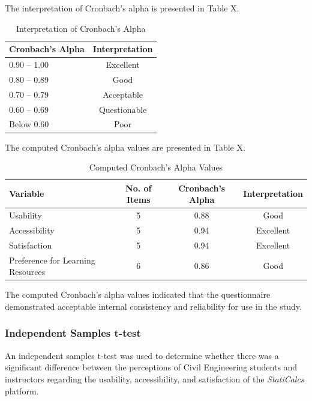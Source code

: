 The interpretation of Cronbach’s alpha is presented in Table X.

\begin{table}[H]
\centering
\caption{Interpretation of Cronbach's Alpha}
\small
\renewcommand{\arraystretch}{1.3}

\begin{tabular}{lc}
\hline
\textbf{Cronbach's Alpha} & \textbf{Interpretation}\\
\hline
0.90 -- 1.00 & Excellent\\
0.80 -- 0.89 & Good\\
0.70 -- 0.79 & Acceptable\\
0.60 -- 0.69 & Questionable\\
Below 0.60 & Poor\\
\hline
\end{tabular}
\end{table}

The computed Cronbach’s alpha values are presented in Table X.

\begin{table}[H]
\centering
\caption{Computed Cronbach's Alpha Values}
\small
\renewcommand{\arraystretch}{1.3}

\begin{tabular}{lccc}
\hline
\textbf{Variable} & \textbf{No. of Items} & \textbf{Cronbach's Alpha} & \textbf{Interpretation}\\
\hline
Usability & 5 & 0.88 & Good\\
Accessibility & 5 & 0.94 & Excellent\\
Satisfaction & 5 & 0.94 & Excellent\\
Preference for Learning Resources & 6 & 0.86 & Good\\
\hline
\end{tabular}
\end{table}

The computed Cronbach’s alpha values indicated that the questionnaire demonstrated acceptable internal consistency and reliability for use in the study.

\subsubsection*{Independent Samples t-test}

An independent samples t-test was used to determine whether there was a significant difference between the perceptions of Civil Engineering students and instructors regarding the usability, accessibility, and satisfaction of the \textit{StatiCalcs} platform.  

